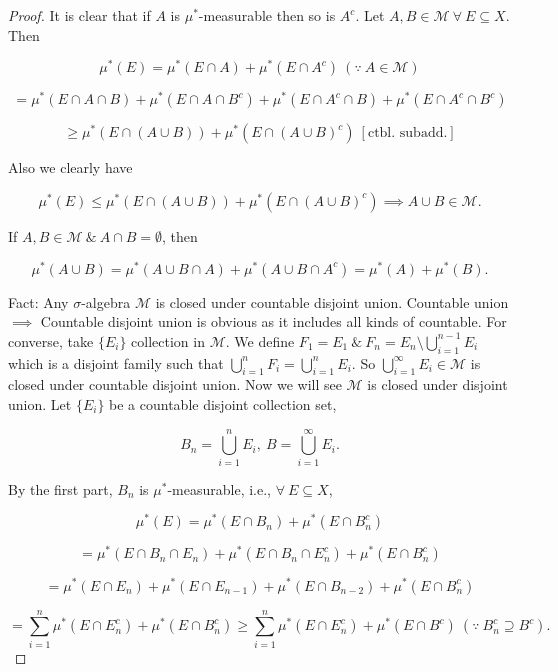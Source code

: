 \documentclass{functionspaces}
\begin{document}
\begin{proof}
It is clear that if $A$ is $\mu^{*}$-measurable then so is $A^{c}$. Let $A,B \in \mathcal{M}\ \forall\ E \subseteq X$. Then

\[
\mu^{*}(E) = \mu^{*}(E \cap A) + \mu^{*}(E \cap A^{c}) \ (\because\ A \in \mathcal{M})
\]

\[
= \mu^{*}(E \cap A \cap B) + \mu^{*}(E \cap A \cap B^{c}) + \mu^{*}(E \cap A^{c} \cap B) + \mu^{*}(E \cap A^{c} \cap B^{c})
\]

\[
\geq \mu^{*}(E \cap (A \cup B)) + \mu^{*}(E \cap (A \cup B)^{c})\ [\text{ctbl. subadd.}]
\]

Also we clearly have

\[
\mu^{*}(E) \leq \mu^{*}(E \cap (A \cup B)) + \mu^{*}(E \cap (A \cup B)^{c}) \implies A \cup B \in \mathcal{M}.
\]

If $A,B \in \mathcal{M}\ \&\ A \cap B = \emptyset$, then

\[
\mu^{*}(A \cup B) = \mu^{*}(A \cup B \cap A) + \mu^{*}(A \cup B \cap A^{c}) = \mu^{*}(A) + \mu^{*}(B).
\]

Fact: Any $\sigma$-algebra $\mathcal{M}$ is closed under countable disjoint union. Countable union $\implies$ Countable disjoint union is obvious as it includes all kinds of countable. For converse, take $\{E_{i}\}$ collection in $\mathcal{M}$. We define $F_{1} = E_{1}\ \&\ F_{n} = E_{n} \setminus \bigcup_{i=1}^{n-1} E_{i}$ which is a disjoint family such that $\bigcup_{i=1}^{n} F_{i} = \bigcup_{i=1}^{n} E_{i}$. So $\bigcup_{i=1}^{\infty} E_{i} \in \mathcal{M}$ is closed under countable disjoint union. Now we will see $\mathcal{M}$ is closed under disjoint union. Let $\{E_{i}\}$ be a countable disjoint collection set,

\[
B_{n} = \bigcup_{i=1}^{n} E_{i},\ B = \bigcup_{i=1}^{\infty} E_{i}.
\]

By the first part, $B_{n}$ is $\mu^{*}$-measurable, i.e., $\forall\ E \subseteq X$,

\[
\mu^{*}(E) = \mu^{*}(E \cap B_{n}) + \mu^{*}(E \cap B_{n}^{c})
\]

\[
= \mu^{*}(E \cap B_{n} \cap E_{n}) + \mu^{*}(E \cap B_{n} \cap E_{n}^{c}) + \mu^{*}(E \cap B_{n}^{c})
\]

\[
= \mu^{*}(E \cap E_{n}) + \mu^{*}(E \cap E_{n-1}) + \mu^{*}(E \cap B_{n-2}) + \mu^{*}(E \cap B_{n}^{c})
\]

\[
= \sum_{i=1}^{n} \mu^{*}(E \cap E_{n}^{c}) + \mu^{*}(E \cap B_{n}^{c}) \geq \sum_{i=1}^{n} \mu^{*}(E \cap E_{n}^{c}) + \mu^{*}(E \cap B^{c})\ (\because\ B_{n}^{c} \supseteq B^{c}).
\]


\end{proof}
\end{document}
